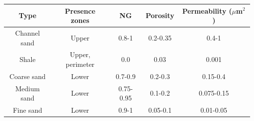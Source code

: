 \begin{tabular}{ccccc}
\toprule
Type            & Presence zones        & NG        & Porosity      & Permeability ($\mu$m$^\text{2}$)     \\ \midrule
Channel sand    & Upper                 & 0.8-1     & 0.2-0.35      & 0.4-1      \\
Shale           & Upper, perimeter      & 0.0       & 0.03          & 0.001      \\
Coarse sand     & Lower                 & 0.7-0.9   & 0.2-0.3       & 0.15-0.4   \\
Medium sand     & Lower                 & 0.75-0.95 & 0.1-0.2       & 0.075-0.15 \\
Fine sand       & Lower                 & 0.9-1     & 0.05-0.1      & 0.01-0.05  \\
\bottomrule
\end{tabular}